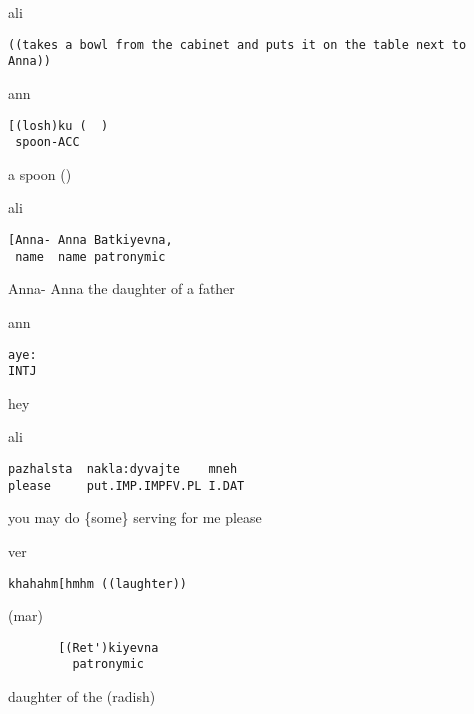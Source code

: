 \documentclass[output=paper,modfonts,nonflat]{langsci/langscibook}
\begin{document}
\vspace{2mm}
%
\begin{transbox}{1}{ali}
\begin{verbatim}
((takes a bowl from the cabinet and puts it on the table next to Anna))
\end{verbatim}
\end{transbox}
%
\begin{transbox}{2}{ann}
\begin{verbatim}
[(losh)ku (  )
 spoon-ACC
\end{verbatim}
\hspace{0.07cm} a spoon (\hspace{0.4cm})
\end{transbox}
%
\begin{mdframednoverticalspace}[style=firstfoc]
\begin{transbox}{3}{ali}
\begin{verbatim}
[Anna- Anna Batkiyevna,
 name  name patronymic
\end{verbatim}
\hspace{0.07cm} Anna- Anna the daughter of a father
\end{transbox}
\end{mdframednoverticalspace}
%
\begin{transbox}{4}{ann}
\begin{verbatim}
aye:
INTJ
\end{verbatim}
hey
\end{transbox}
%
%
\begin{mdframednoverticalspace}[style=firstfoc]
\begin{transbox}{6}{ali}
\begin{verbatim}
pazhalsta  nakla:dyvajte    mneh
please     put.IMP.IMPFV.PL I.DAT
\end{verbatim}
you may do \{some\} serving for me please
\end{transbox}
\end{mdframednoverticalspace}
%
%
\begin{transbox}{8}{ver}
\begin{verbatim}
khahahm[hmhm ((laughter))
\end{verbatim}
\end{transbox}
%
\begin{transbox}{9}{(mar)}
\begin{verbatim}
       [(Ret')kiyevna
         patronymic
\end{verbatim}
\hspace{1.2cm} daughter of the (radish)
\end{transbox}
\end{document}
